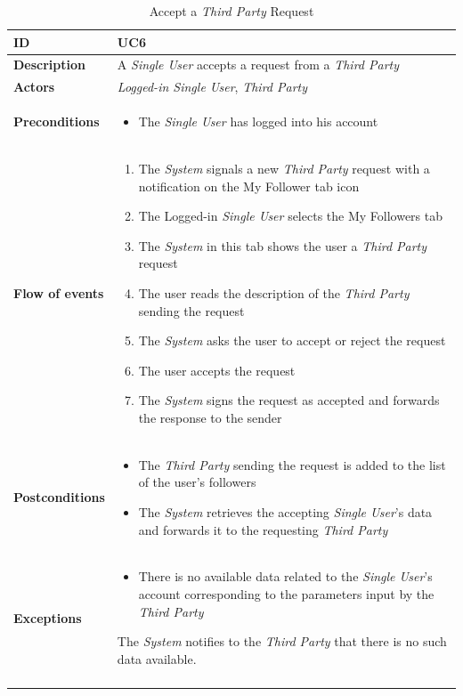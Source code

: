\documentclass[titlepage]{article}
\begin{document}

\begin{longtable}{| p{3 cm} | p{10 cm} |} 
			\hline
			{\bf ID} & UC6 \\
			\hline
			{\bf Description} & A {\it Single User} accepts a request from a {\it Third Party}\\
			\hline
			{\bf Actors} & {\it Logged-in {\it Single User}}, {\it Third Party} \\
			\hline
			{\bf Preconditions} & 		
							\begin{itemize}
								\item The {\it Single User}  has  logged into his account 
							\end{itemize}
			\\
			\hline
			{\bf Flow of events} & 
							\begin{enumerate}
								\item The {\it System} signals a new {\it Third Party} request with a notification on the My Follower tab icon
\item The Logged-in {\it Single User} selects the My Followers tab
\item The {\it System}  in this tab shows the user a {\it Third Party} request
\item The user reads the description of the {\it Third Party} sending the request
\item The {\it System} asks the user to accept or reject the request
\item The user accepts the request
\item The {\it System} signs the request as accepted and forwards the response to the sender
							\end{enumerate}
			
			 \\
			\hline
			{\bf Postconditions} & 
							\begin{itemize}
								\item The {\it Third Party} sending the request is added to the list of the user’s followers
\item The {\it System} retrieves the accepting {\it Single User}’s data and forwards it to the requesting {\it Third Party} 


							\end{itemize}
			\\
			\hline
			{\bf Exceptions} & 
							\begin{itemize}
								\item There is no available data related to the {\it Single User}’s account corresponding to the parameters input by the {\it Third Party}
							\end{itemize}
							The {\it System} notifies to the {\it Third Party} that there is no such data available.

							
			\\
			\hline
			\caption{Accept a {\it Third Party} Request}
			\end{longtable}
\end{document}
